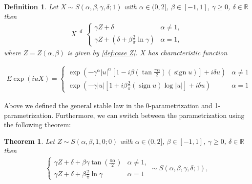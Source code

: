 \documentclass{article}
\newtheorem{theorem}{Theorem}
\newtheorem{definition}{Definition}
\begin{document}
		\begin{definition} Let $X \sim S(\alpha, \beta , \gamma, \delta; 1)$ with $\alpha \in (0,2]$, $\beta \in [-1,1]$, $\gamma \ge 0$, $\delta\in\mathbb{R}$ then  
			\begin{gather*}
				X \stackrel{d}{=} 
				\begin{cases}
					\gamma Z + \delta & \alpha \ne 1,\\
					\gamma Z + (\delta + \beta\frac{2}{\pi}\ln\gamma)& \alpha = 1,
				\end{cases}
			\end{gather*}
			where $Z = Z(\alpha,\beta)$ is given by \ref{def:case Z}. $X$ has characteristic function
			
			\begin{gather*}
				E \exp (i u X)= 
				\begin{cases}
					\exp \left(-\gamma^\alpha|u|^\alpha\left[1-i \beta\left(\tan \frac{\pi \alpha}{2}\right)(\operatorname{sign} u)\right]+i \delta u\right) & \alpha \neq 1 \\ \exp \left(-\gamma|u|\left[1+i \beta \frac{2}{\pi}(\operatorname{sign} u) \log |u|\right]+i \delta u\right) & \alpha=1
				\end{cases}
			\end{gather*}
		\end{definition}

		Above we defined the general stable law in the 0-parametrization and 1-parametrization.
        Furthermore, we can switch between the parametrization using the following theorem:
		\begin{theorem}Let $Z\sim S(\alpha,\beta,1,0;0)$  with $\alpha \in (0,2]$, $\beta \in [-1,1]$, $\gamma \ge 0$, $\delta\in\mathbb{R}$ then  
			\begin{gather*}
				\begin{cases}
					\gamma Z + \delta + \beta \gamma \tan\left(\frac{\pi\alpha}{2}\right) &\alpha\ne1,\\
					\gamma Z + \delta + \beta \frac{2}{\pi}\ln\gamma  &\alpha=1
				\end{cases}\sim S(\alpha,\beta,\gamma,\delta; 1),
			\end{gather*}
		\end{theorem}
\end{document}
